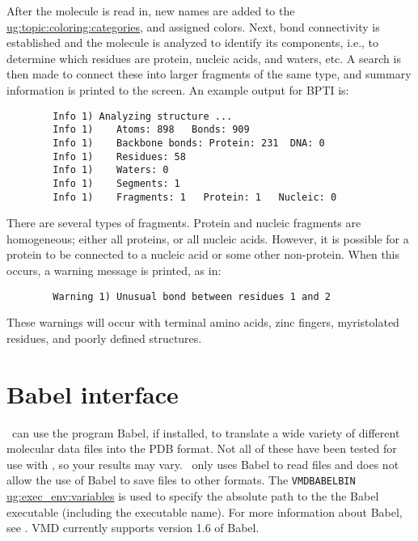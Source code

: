 After the molecule is read in, new names are added to the
\hyperref{coloring categories}{coloring categories [\S }{]}
         {ug:topic:coloring:categories},
and assigned colors.
Next, bond connectivity is established and the molecule is
analyzed to identify its components, i.e., to determine which
residues are protein, nucleic acids, and waters, etc.
A search is then made to connect these into larger fragments of the same type,
and summary information is printed to the screen.  
An example output for BPTI is:
\begin{verbatim}
        Info 1) Analyzing structure ...
        Info 1)    Atoms: 898   Bonds: 909
        Info 1)    Backbone bonds: Protein: 231  DNA: 0
        Info 1)    Residues: 58
        Info 1)    Waters: 0
        Info 1)    Segments: 1
        Info 1)    Fragments: 1   Protein: 1   Nucleic: 0
\end{verbatim}

There are several types of fragments.  Protein and nucleic
fragments are homogeneous; either all proteins, or all nucleic acids.
However, it is possible for a protein to be connected to a
nucleic acid or some other non-protein.  
When this occurs, a warning message is printed, as in:
\begin{verbatim}
        Warning 1) Unusual bond between residues 1 and 2
\end{verbatim}
These warnings will occur with terminal amino acids, zinc
fingers, myristolated residues, and poorly defined structures.

\section{Babel interface}
\label{ug:topic:filetypes:babel}
\VMD\ can use the program Babel, if installed, to
translate a wide variety of different molecular data files into the
PDB format.  Not all of these have been tested for use with \VMD, 
so your results may vary.
\VMD\ only uses Babel to read files and does not
allow the use of Babel to save files to other formats.
The {\tt VMDBABELBIN} 
\hyperref{environment variable}{environment variable [\S }{]}{ug:exec_env:variables}
is used to specify the absolute path to the the Babel executable 
(including the executable name).
For more information about Babel, see .  
VMD currently supports version 1.6 of Babel.  

